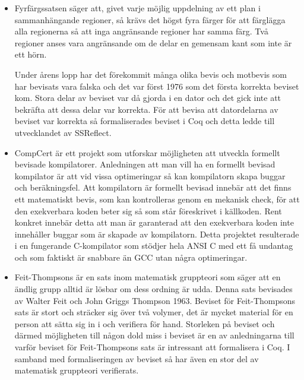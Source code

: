 \begin{itemize}

\item Fyrfärgssatsen\autocite{gonthier2008formal} säger att, givet varje möjlig
uppdelning av ett plan i sammanhängande regioner, så krävs det högst fyra
färger för att färglägga alla regionerna så att inga angränsande regioner har
samma färg. Två regioner anses vara angränsande om de delar en gemensam kant
som inte är ett hörn.

Under årens lopp har det förekommit många olika bevis och motbevis som har
bevisats vara falska och  det var först 1976 som det första korrekta beviset
kom. Stora delar av beviset var då gjorda i en dator och det gick inte att
bekräfta att dessa delar var korrekta. För att bevisa att datordelarna av
beviset var korrekta så formaliserades beviset i Coq och detta ledde till
utvecklandet av SSReflect.

\item CompCert\autocite{compcert} är ett projekt som utforskar möjligheten att
utveckla formellt bevisade kompilatorer. Anledningen att man vill ha en
formellt bevisad kompilator är att vid vissa optimeringar så kan kompilatorn
skapa buggar och beräkningsfel. Att kompilatorn är formellt bevisad innebär att
det finns ett matematiskt bevis, som kan kontrolleras genom en mekanisk check,
för att den exekverbara koden beter sig så som står föreskrivet i källkoden.
Rent konkret innebär detta att man är garanterad att den exekverbara koden inte
innehåller buggar som är skapade av kompilatorn. Detta projektet resulterade i
en fungerande C-kompilator som stödjer hela ANSI C med ett få undantag och som
faktiskt är snabbare än GCC utan några optimeringar.

\item Feit-Thompsons är en sats inom matematisk gruppteori som säger att en
ändlig grupp alltid är lösbar om dess ordning är
udda\cite{aschbacher2004status}. Denna sats bevisades av Walter Feit och John
Griggs Thompson 1963. Beviset för Feit-Thompsons sats är stort och sträcker sig
över två volymer, det är mycket material för en person att sätta sig in i och
verifiera för hand. Storleken på beviset och därmed möjligheten till någon dold
miss i beviset är en av anledningarna till varför beviset för Feit-Thompsons
sats är intressant att formalisera i Coq. I samband med formaliseringen av
beviset så har även en stor del av matematisk gruppteori verifierats.

\end{itemize}

